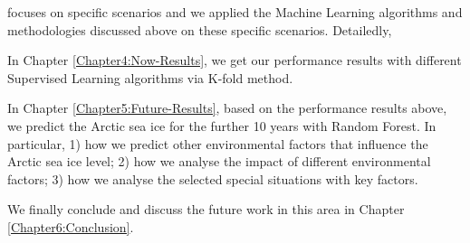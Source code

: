  focuses on specific scenarios and we applied the Machine Learning algorithms and methodologies discussed above on these specific scenarios. Detailedly,
\begin{description}
    \item In Chapter \ref{Chapter4:Now-Results},  we get our performance results with different Supervised Learning algorithms via K-fold method.
    \item In Chapter \ref{Chapter5:Future-Results},  based on the performance results above, we predict the Arctic sea ice for the further 10 years with Random Forest.  In particular, 1) how we predict other environmental factors that influence the Arctic sea ice level; 2) how we analyse the impact of different environmental factors; 3) how we analyse the selected special situations with key factors.
\end{description}
 We finally conclude and discuss the future work in this area in Chapter \ref{Chapter6:Conclusion}.
